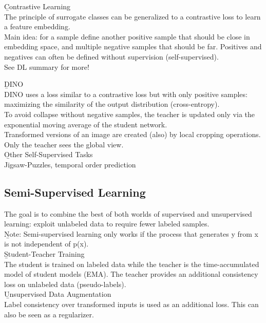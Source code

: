 \b{Contrastive Learning\\[0.5em]}
The principle of surrogate classes can be generalized to a contrastive loss to learn a feature embedding. \\

Main idea: for a sample define another positive sample that should be close in embedding space, and multiple negative samples that should be far. Positives and negatives can often be defined without supervision (self-supervised).\\

See DL summary for more!\\
\newpage

\b{DINO\\[0.5em]}
DINO uses a loss similar to a contrastive loss but with only positive samples: maximizing the similarity of the output distribution (cross-entropy).\\

To avoid collapse without negative samples, the teacher is updated only via the exponential moving average of the student network.\\

Transformed versions of an image are created (also) by local cropping operations. Only the teacher sees the global view.\\

\b{Other Self-Supervised Tasks\\[0.5em]}
Jigsaw-Puzzles, temporal order prediction

\subsection{Semi-Supervised Learning}
The goal is to combine the best of both worlds of supervised and unsupervised learning: exploit unlabeled data to require fewer labeled samples.\\

\b{Note:} Semi-supervised learning only works if the process that generates y from x is not independent of p(x).\\

\b{Student-Teacher Training\\[0.5em]}
The student is trained on labeled data while the teacher is the time-accumulated model of student models (EMA). The teacher provides an additional consistency loss on unlabeled data (pseudo-labels).\\

\b{Unsupervised Data Augmentation\\[0.5em]}
Label consistency over transformed inputs is used as an additional loss. This can also be seen as a regularizer.\\

